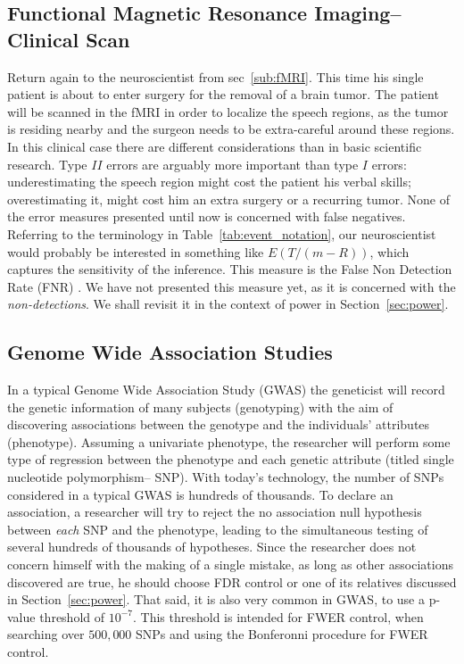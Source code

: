 \documentclass[review,12pt]{article}
\theoremstyle{definition}
\theoremstyle{definition}
\begin{document}
\subsection{Functional Magnetic Resonance Imaging-- Clinical Scan}
Return again to the neuroscientist from sec~\ref{sub:fMRI}. This time his single patient is about to enter surgery for the removal of a brain tumor. 
The patient will be scanned in the fMRI in order to localize the speech regions, as the tumor is residing nearby and the surgeon needs to be extra-careful around these regions. 
In this clinical case there are different considerations than in basic scientific research. 
Type $II$ errors are arguably more important than type $I$ errors: underestimating the speech region might cost the patient his verbal skills; overestimating it, might cost him an extra surgery or a recurring tumor. 
None of the error measures presented until now is concerned with false negatives. 
Referring to the terminology in Table~\ref{tab:event_notation}, our neuroscientist would probably be interested in something like $E(T/(m-R))$, which captures the sensitivity of the inference. 
This measure is the False Non Detection Rate (FNR) \citep{genovese_operating_2002}. 
We have not presented this measure yet, as it is concerned with the \emph{non-detections}. We shall revisit it in the context of power in Section~\ref{sec:power}. 




\subsection{\label{sec:GWAS}Genome Wide Association Studies}
In a typical Genome Wide Association Study (GWAS) the geneticist will record the genetic information of many subjects (genotyping) with the aim of discovering associations between the genotype and the individuals' attributes (phenotype). Assuming a univariate phenotype, the researcher will perform some type of regression between the phenotype and each genetic attribute (titled single nucleotide polymorphism-- SNP). With today's technology, the number of SNPs considered in a typical GWAS is hundreds of thousands. To declare an association, a researcher will try to reject the no association null hypothesis between \emph{each} SNP and the phenotype, leading to the simultaneous testing of several hundreds of thousands of hypotheses. 
Since the researcher does not concern himself with the making of a single mistake, as long as other associations discovered are true, he should choose FDR control or one of its relatives discussed in Section~\ref{sec:power}. 
That said, it is also very common in GWAS, to use a p-value threshold of $10^{-7}$. This threshold is intended for FWER control, when searching over $500,000$ SNPs and using the Bonferonni procedure \cite{bush_chapter_2012} for FWER control. 
\end{document}
